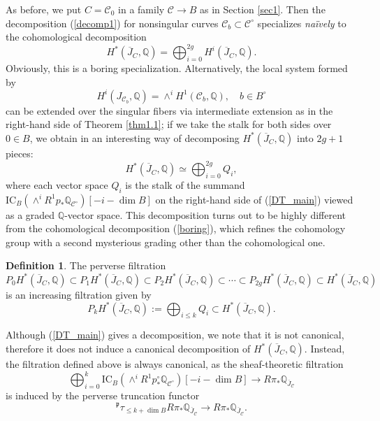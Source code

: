 \documentclass{pspum-l}
\theoremstyle{plain}
\theoremstyle{definition}
\newtheorem{defn}[thm]{Definition}
\theoremstyle{remark}
\newcommand{\BQ}{{\mathbb{Q}}}
\newcommand{\CC}{{\mathcal C}}
\begin{document}
As before, we put $C = \CC_0$ in a family $\CC \to B$ as in Section \ref{sec1}. Then the decomposition (\ref{decomp1}) for nonsingular curves $\CC_b \subset \CC^\circ$ specializes \emph{na\"ively} to the cohomological decomposition
\begin{equation}\label{boring}
H^*(\overline{J}_C, \BQ) = \bigoplus_{i=0}^{2g} H^i(\overline{J}_C, \BQ).
\end{equation}
Obviously, this is a boring specialization. Alternatively, the local system formed by 
\[
H^i(J_{\CC_b}, \BQ) = \wedge^i H^1(\CC_b, \BQ),\quad b\in B^\circ
\]
can be extended over the singular fibers via intermediate extension as in the right-hand side of Theorem \ref{thm1.1}; if we take the stalk for both sides over $0\in B$, we obtain in an interesting way of decomposing $H^*(\overline{J}_C, \BQ)$ into $2g+1$ pieces:
\begin{equation}\label{decomp2}
H^*(\overline{J}_C, \BQ) \simeq \bigoplus_{i=0}^{2g} Q_i,
\end{equation}
where each vector space $Q_i$ is the stalk of the summand $\mathrm{IC}_B\left(  \wedge^i R^1p_* \BQ_{{\CC^\circ}}\right)[-i -\dim B]$ on the right-hand side of (\ref{DT_main}) viewed as a graded $\BQ$-vector space. This decomposition turns out to be highly different from the cohomological decomposition (\ref{boring}), which refines the cohomology group with a second mysterious grading other than the cohomological one.


\begin{defn}\label{def2.1}
The perverse filtration   
  \begin{equation}\label{P_fil}
P_0H^*(\overline{J}_C, \BQ) \subset P_1H^*(\overline{J}_C, \BQ) \subset  P_2H^*(\overline{J}_C, \BQ) \subset \cdots \subset P_{2g}H^*(\overline{J}_C, \BQ) \subset H^*(\overline{J}_C, \BQ)
\end{equation}
is an increasing filtration given by 
\[
P_k H^*(\overline{J}_C, \BQ):= \bigoplus_{i\leq k} Q_i \subset H^*(\overline{J}_C, \BQ).
\]
\end{defn}

Although (\ref{DT_main}) gives a decomposition, we note that it is not canonical, therefore it does not induce a canonical decomposition of $H^*(\overline{J}_C, \BQ)$. Instead, the filtration defined above is always canonical, as the sheaf-theoretic filtration
\[
\bigoplus_{i=0}^{k}  \mathrm{IC}_B\left(  \wedge^i R^1p^\circ_* \BQ_{{\CC^\circ}}\right)[-i -\dim B] \to R\pi_*\BQ_{\overline{J}_\CC}
\]
is induced by the perverse truncation functor
\[
{^\mathfrak{p}}\tau_{\leq k+\dim B} R\pi_* \BQ_{\overline{J}_\CC} \to R\pi_*\BQ_{\overline{J}_\CC}.
\]
\end{document}
